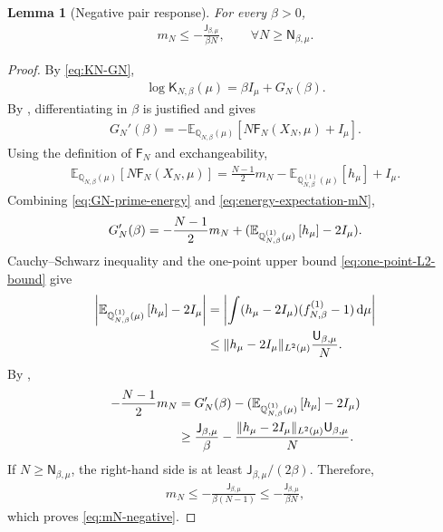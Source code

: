 \documentclass[11pt,reqno]{amsart}
\numberwithin{equation}{section}
\theoremstyle{plain}
\newtheorem{lemma}[lemma]{Lemma}
\theoremstyle{remark}
\DeclarePairedDelimiter{\pa}{\lparen}{\rparen}
\DeclarePairedDelimiter{\norm}{\lVert}{\rVert}
\newcommand{\md}{\mathrm{d}}
\newcommand{\E}{{\mathbb{E}}}
\newcommand{\Q}{{\mathbb{Q}}}
\newcommand{\K}{{\mathsf{K}}}
\newcommand{\Fr}{{\mathsf{F}}}
\newcommand{\XN}{X_N}
\newcommand{\be}{\beta}
\begin{document}
\begin{lemma}[Negative pair response]\label{lem:pair-response-lower}
For every \(\be>0\),
\begin{align}\label{eq:mN-negative}
 m_N\le -\frac{\mathsf J_{\be,\mu}}{\be N},
 \qquad \forall N\ge \mathsf N_{\be,\mu}.
\end{align}
\end{lemma}

\begin{proof}
By \eqref{eq:KN-GN},
\begin{align}\label{eq:log-partition-GN}
 \log\K_{N,\be}(\mu)=\be I_\mu+G_N(\be).
\end{align}
By , differentiating in \(\be\) is justified and gives
\begin{align}\label{eq:GN-prime-energy}
 G_N'(\be)
 =-\E_{\Q_{N,\be}(\mu)}\left[N\Fr_N(\XN,\mu)+I_\mu\right].
\end{align}
Using the definition of \(\Fr_N\) and exchangeability,
\begin{align}\label{eq:energy-expectation-mN}
 \E_{\Q_{N,\be}(\mu)}\left[N\Fr_N(\XN,\mu)\right]
 =\frac{N-1}{2}m_N-
 \E_{\Q_{N,\be}^{(1)}(\mu)}\left[h_\mu\right]+I_\mu.
\end{align}
Combining \eqref{eq:GN-prime-energy} and \eqref{eq:energy-expectation-mN},
\begin{align}\label{eq:GN-prime-mN}
 G_N'(\be)
 =-\frac{N-1}{2}m_N+
 \pa{\E_{\Q_{N,\be}^{(1)}(\mu)}\left[h_\mu\right]-2I_\mu}.
\end{align}
Cauchy--Schwarz inequality and the one-point upper bound
\eqref{eq:one-point-L2-bound} give
\begin{align}
 \left|\E_{\Q_{N,\be}^{(1)}(\mu)}\left[h_\mu\right]-2I_\mu\right|
 &=\left|\int (h_\mu-2I_\mu)(f_{N,\be}^{(1)}-1)\,\md\mu\right|\notag\\
 &\le \norm{h_\mu-2I_\mu}_{L^2(\mu)}
      \frac{\mathsf U_{\be,\mu}}{N}.
 \label{eq:h-one-point-error}
\end{align}
By ,
\begin{align}
 -\frac{N-1}{2}m_N
 &=G_N'(\be)-\pa{\E_{\Q_{N,\be}^{(1)}(\mu)}\left[h_\mu\right]-2I_\mu}\notag\\
 &\ge \frac{\mathsf J_{\be,\mu}}{\be}
      -\frac{\norm{h_\mu-2I_\mu}_{L^2(\mu)}
              \mathsf U_{\be,\mu}}{N}.
 \label{eq:mN-preliminary-lower}
\end{align}
If \(N\ge\mathsf N_{\be,\mu}\), the right-hand side is at least
\(\mathsf J_{\be,\mu}/(2\be)\).  Therefore,
\begin{align}\label{eq:mN-negative-conclusion}
 m_N\le -\frac{\mathsf J_{\be,\mu}}{\be(N-1)}
 \le -\frac{\mathsf J_{\be,\mu}}{\be N},
\end{align}
which proves \eqref{eq:mN-negative}.
\end{proof}
\end{document}
